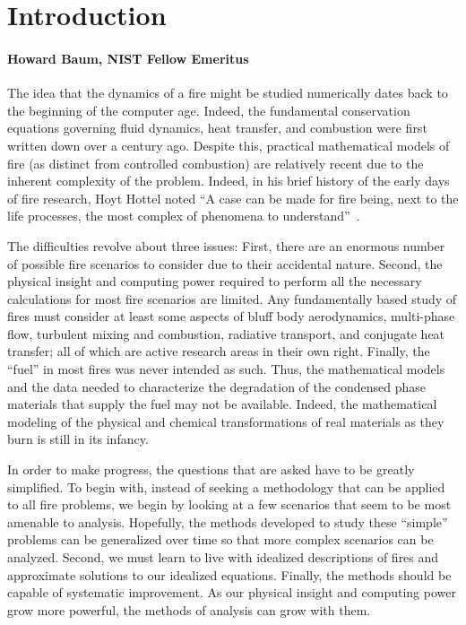 \documentclass[11pt]{book}
\begin{document}
\tableofcontents

\mainmatter


\chapter{Introduction}
\subsubsection{Howard Baum, NIST Fellow Emeritus}

The idea that the dynamics of a fire might be studied numerically dates back
to the beginning of the computer age. Indeed, the fundamental
conservation equations governing fluid dynamics, heat transfer, and
combustion were first written down over a century ago.
Despite this, practical mathematical models of fire
(as distinct from controlled combustion) are relatively recent due
to the inherent complexity of the problem.
Indeed, in his brief history of the early days of fire research,
Hoyt Hottel noted ``A case can be made for fire being,
next to the life processes, the most complex of phenomena to understand''~\cite{Hottel:1}.

The difficulties revolve about three issues:
First, there are an enormous number of possible fire scenarios
to consider due to their accidental nature. Second, the physical
insight and computing power required to perform all the necessary calculations
for most fire scenarios are limited. Any fundamentally based study of fires
must consider at least some aspects of bluff body aerodynamics, multi-phase flow,
turbulent mixing and combustion, radiative transport, and conjugate heat transfer;
all of which are active research areas in their own right.
Finally, the ``fuel'' in most fires was never intended as such.
Thus, the mathematical models and the data needed to characterize the
degradation of the condensed phase materials that supply the fuel may not be available.
Indeed, the mathematical modeling of the physical and
chemical transformations of real materials as they burn is still in its infancy.

In order to make progress, the questions that are asked have to be greatly simplified.
To begin with, instead of seeking a methodology that can be applied to all fire problems,
we begin by looking at a few scenarios that seem to be most amenable to analysis.
Hopefully, the methods developed to study these ``simple'' problems can be generalized
over time so that more complex scenarios can be analyzed.
Second, we must learn to live with idealized descriptions of fires and approximate
solutions to our idealized equations. Finally, the methods should be capable of systematic improvement.
As our physical insight and computing power grow more powerful, the methods of analysis can
grow with them.
\end{document}
